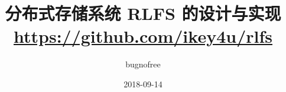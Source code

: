 \title{分布式存储系统 RLFS 的设计与实现 \\ \href{https://github.com/ikey4u/rlfs}{\small{https://github.com/ikey4u/rlfs}}}
\author{bugnofree}
\date{2018-09-14}
\maketitle
\tableofcontents
